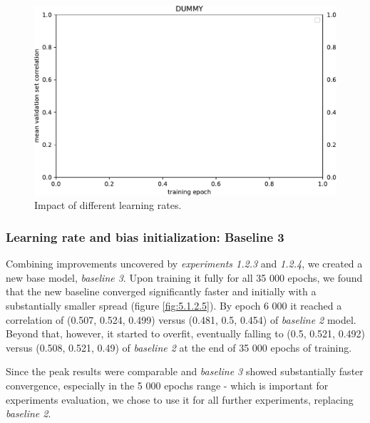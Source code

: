 \begin{figure}[H]
    \centering
    \includegraphics[width=1\textwidth]{../figures/05_dummy}
    \caption[Experiment 1.2.4]{Impact of different learning rates.}
    \label{fig:5.1.2.4}
\end{figure}

\subsubsection{Learning rate and bias initialization: Baseline 3}\label{ex:1.2.5}

Combining improvements uncovered by \emph{experiments 1.2.3} and \emph{1.2.4}, we created a new base model, \emph{baseline 3}. Upon training it fully for all 35 000 epochs, we found that the new baseline converged significantly faster and initially with a substantially smaller spread (figure \ref{fig:5.1.2.5}). By epoch 6 000 it reached a correlation of (0.507, 0.524, 0.499) versus (0.481, 0.5, 0.454) of \emph{baseline 2} model. Beyond that, however, it started to overfit, eventually falling to (0.5, 0.521, 0.492) versus (0.508, 0.521, 0.49) of \emph{baseline 2} at the end of 35 000 epochs of training. 

Since the peak results were comparable and \emph{baseline 3} showed substantially faster convergence, especially in the 5 000 epochs range - which is important for experiments evaluation, we chose to use it for all further experiments, replacing \emph{baseline 2}.

